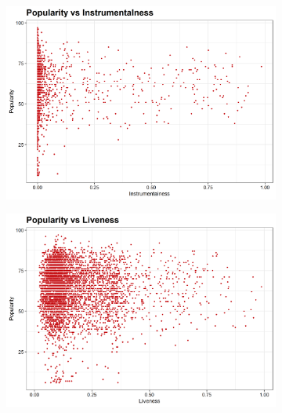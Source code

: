 \documentclass[12pt, twoside]{article}
\begin{document}
\begin{figure}[H]
\ContinuedFloat
\begin{subfigure}[b]{0.5\textwidth}
\centering
\includegraphics[width = \textwidth]{pop_vs_track_instrumentalness.png}
\caption{}
\label{fig:duration_trend}
\end{subfigure}
\begin{subfigure}[b]{0.5\textwidth}
\centering
\includegraphics[width = \textwidth]{pop_vs_track_liveness.png}
\caption{}
\label{fig:duration_trend}
\end{subfigure}
\label{fig:multipart_figure}
\begin{subfigure}[b]{0.5\textwidth}
\centering

\end{subfigure}
\end{figure}
\end{document}
